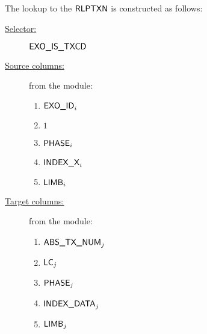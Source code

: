 The lookup to the $\textsf{RLPTXN}$ is constructed as follows:
\begin{description}
	\item[\underline{Selector:}] $\textsf{EXO\_IS\_TXCD}$
	\item[\underline{Source columns:}] from the \mmioMod{} module:
		\begin{multicols}{3}
			\begin{enumerate}
				\item $\textsf{EXO\_ID}_{i}$
				\item $1$
				\item $\textsf{PHASE}_{i}$
				\item $\textsf{INDEX\_X}_{i}$
				\item $\textsf{LIMB}_{i}$
			\end{enumerate}
		\end{multicols}
	\item[\underline{Target columns:}] from the \rlpTxnMod{} module: 
		\begin{multicols}{3}
			\begin{enumerate}
				\item $\textsf{ABS\_TX\_NUM}_{j}$
				\item $\textsf{LC}_{j}$
				\item $\textsf{PHASE}_{j}$
				\item $\textsf{INDEX\_DATA}_{j}$
				\item $\textsf{LIMB}_{j}$
			\end{enumerate}
		\end{multicols}
\end{description}